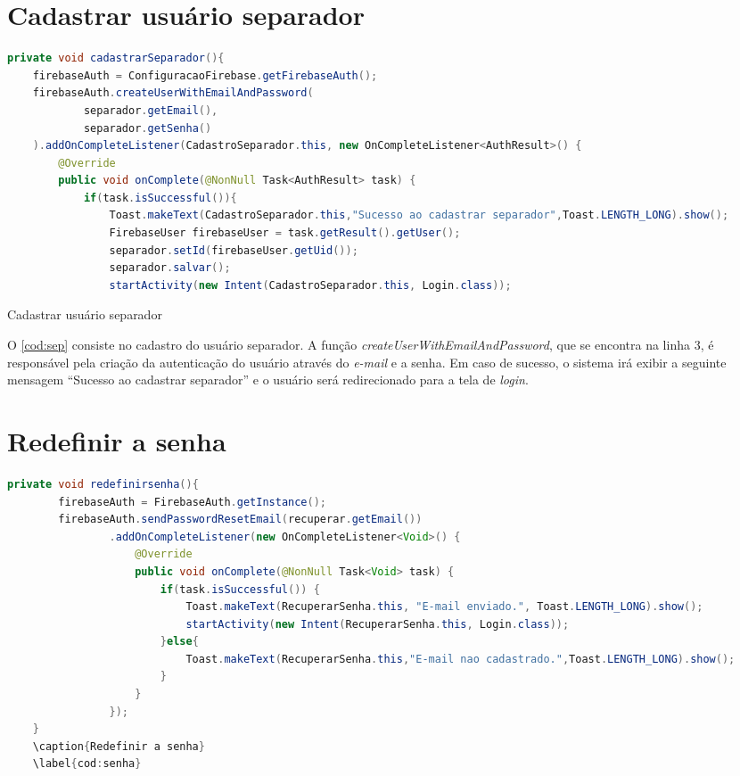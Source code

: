 \section{Cadastrar usuário separador}

\begin{codigo}[H]
	\begin{lstlisting}[language=Java]
private void cadastrarSeparador(){
    firebaseAuth = ConfiguracaoFirebase.getFirebaseAuth();
    firebaseAuth.createUserWithEmailAndPassword(
            separador.getEmail(),
            separador.getSenha()
    ).addOnCompleteListener(CadastroSeparador.this, new OnCompleteListener<AuthResult>() {
        @Override
        public void onComplete(@NonNull Task<AuthResult> task) {
            if(task.isSuccessful()){
                Toast.makeText(CadastroSeparador.this,"Sucesso ao cadastrar separador",Toast.LENGTH_LONG).show();
                FirebaseUser firebaseUser = task.getResult().getUser();
                separador.setId(firebaseUser.getUid());
                separador.salvar();
                startActivity(new Intent(CadastroSeparador.this, Login.class));
       	\end{lstlisting}
       	\caption{Cadastrar usuário separador}
       	\label{cod:sep}
\end{codigo}

O \autoref{cod:sep} consiste no cadastro do usuário separador. A função \textit{createUserWithEmailAndPassword}, que se encontra na linha 3, é responsável pela criação da autenticação do usuário através do \textit{e-mail} e a senha. Em caso de sucesso, o sistema irá exibir a seguinte mensagem “Sucesso ao cadastrar separador” e o usuário será redirecionado para a tela de \textit{login}.

\section{Redefinir a senha}

\begin{codigo}[H]
	\begin{lstlisting}[language=Java]
	private void redefinirsenha(){
        firebaseAuth = FirebaseAuth.getInstance();
        firebaseAuth.sendPasswordResetEmail(recuperar.getEmail())
                .addOnCompleteListener(new OnCompleteListener<Void>() {
                    @Override
                    public void onComplete(@NonNull Task<Void> task) {
                        if(task.isSuccessful()) {
                            Toast.makeText(RecuperarSenha.this, "E-mail enviado.", Toast.LENGTH_LONG).show();
                            startActivity(new Intent(RecuperarSenha.this, Login.class));
                        }else{
                            Toast.makeText(RecuperarSenha.this,"E-mail nao cadastrado.",Toast.LENGTH_LONG).show();
                        }
                    }
                });
    }
    \caption{Redefinir a senha}
    \label{cod:senha}
 	\end{lstlisting}
\end{codigo}

